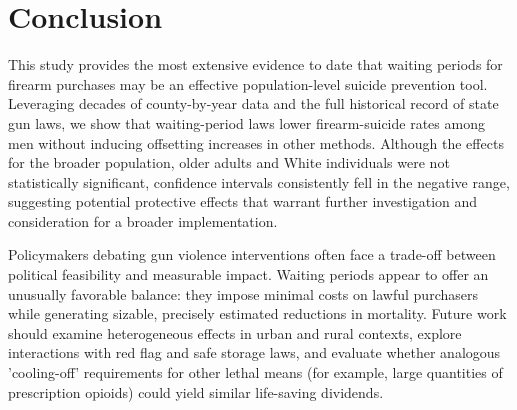 \section{Conclusion} \label{sec:conc}

This study provides the most extensive evidence to date that waiting periods for firearm purchases may be an effective population-level suicide prevention tool. Leveraging decades of county-by-year data and the full historical record of state gun laws, we show that waiting-period laws lower firearm-suicide rates among men without inducing offsetting increases in other methods. Although the effects for the broader population, older adults and White individuals were not statistically significant, confidence intervals consistently fell in the negative range, suggesting potential protective effects that warrant further investigation and consideration for a broader implementation.

Policymakers debating gun violence interventions often face a trade-off between political feasibility and measurable impact. Waiting periods appear to offer an unusually favorable balance: they impose minimal costs on lawful purchasers while generating sizable, precisely estimated reductions in mortality. Future work should examine heterogeneous effects in urban and rural contexts, explore interactions with red flag and safe storage laws, and evaluate whether analogous 'cooling-off' requirements for other lethal means (for example, large quantities of prescription opioids) could yield similar life-saving dividends.

